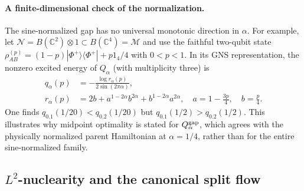 \documentclass[a4paper,11pt]{article}
\theoremstyle{definition}
\newcommand{\nn}{\nonumber}
\newcommand{\mN}{\mathcal{N}}
\newcommand{\mM}{\mathcal{M}}
\begin{document}
\paragraph{A finite-dimensional check of the normalization.}
The sine-normalized gap has no universal monotonic direction in
$\alpha$. For example, let
$\mN=B(\mathbb C^2)\otimes1\subset B(\mathbb C^4)=\mM$
and use the faithful two-qubit state
$\rho_{AB}^{(p)}=(1-p)|\Phi^+\rangle\langle\Phi^+|+p1_4/4$
with $0<p<1$. In its GNS representation, the nonzero excited
energy of $Q_\alpha$ (with multiplicity three) is
\begin{align}
 q_\alpha(p)&=-\frac{\log r_\alpha(p)}{2\sin(2\pi\alpha)},\nn\\
 r_\alpha(p)&=2b+a^{1-2\alpha}b^{2\alpha}
                   +b^{1-2\alpha}a^{2\alpha},
 \quad a=1-\frac{3p}{4},\quad b=\frac p4.
 \label{eq:Q-alpha-two-qubit-counterexample}
\end{align}
One finds $q_{0.1}(1/20)<q_{0.2}(1/20)$ but
$q_{0.1}(1/2)>q_{0.2}(1/2)$. This illustrates why midpoint
optimality is stated for $Q_\alpha^{\rm gap}$, which agrees
with the physically normalized parent Hamiltonian at $\alpha=1/4$,
rather than for the entire sine-normalized family.

\subsection{$L^2$-nuclearity and the canonical split flow}
\label{sec:nuclearity}
\end{document}
